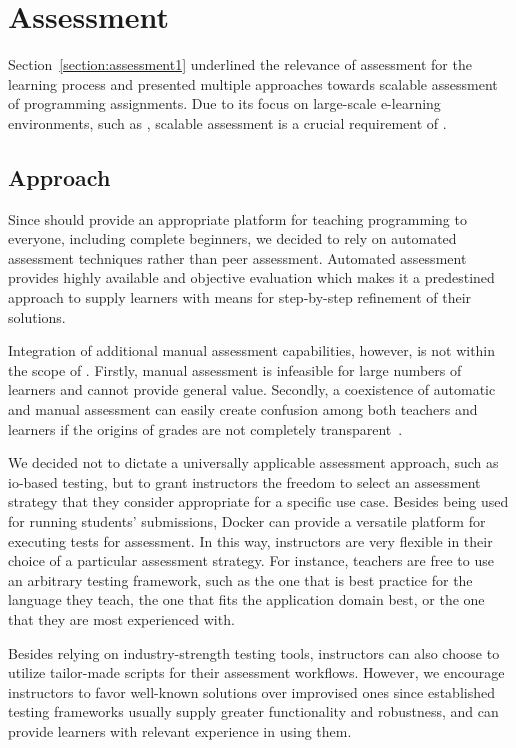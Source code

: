 \section{Assessment}\label{section:assessment2}

Section~\ref{section:assessment1} underlined the relevance of assessment for the learning process and presented multiple approaches towards scalable assessment of programming assignments. Due to its focus on large-scale e-learning environments, such as \moocs, scalable assessment is a crucial requirement of \tool.

\subsection{Approach}

Since \tool should provide an appropriate platform for teaching programming to everyone, including complete beginners, we decided to rely on automated assessment techniques rather than peer assessment. Automated assessment provides highly available and objective evaluation which makes it a predestined approach to supply learners with means for step-by-step refinement of their solutions.

Integration of additional manual assessment capabilities, however, is not within the scope of \tool. Firstly, manual assessment is infeasible for large numbers of learners and cannot provide general value. Secondly, a coexistence of automatic and manual assessment can easily create confusion among both teachers and learners if the origins of grades are not completely transparent~\cite{ihantola2010review}.

We decided not to dictate a universally applicable assessment approach, such as \gls{io}-based testing, but to grant instructors the freedom to select an assessment strategy that they consider appropriate for a specific use case. Besides being used for running students' submissions, Docker can provide a versatile platform for executing tests for assessment. In this way, instructors are very flexible in their choice of a particular assessment strategy. For instance, teachers are free to use an arbitrary testing framework, such as the one that is best practice for the language they teach, the one that fits the application domain best, or the one that they are most experienced with.

Besides relying on industry-strength testing tools, instructors can also choose to utilize tailor-made scripts for their assessment workflows. However, we encourage instructors to favor well-known solutions over improvised ones since established testing frameworks usually supply greater functionality and robustness, and can provide learners with relevant experience in using them.

